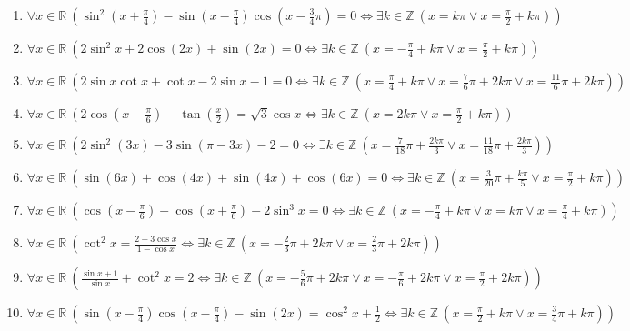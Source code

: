 \documentclass[11pt,a4paper]{article}
\begin{document}
\begin{enumerate}
\item $\displaystyle \forall x \in \mathbb{R}\ \left( \sin^{2}\left(x + \frac{\pi}{4}\right) - \sin\left(x - \frac{\pi}{4}\right)\cos\left(x - \frac{3}{4}\pi\right) = 0 \iff \exists k \in \mathbb{Z}\ \left( x = k\pi \lor x = \frac{\pi}{2} + k\pi \right) \right)$
\item $\displaystyle \forall x \in \mathbb{R}\ \left( 2\sin^{2} x + 2\cos\left(2x\right) + \sin\left(2x\right) = 0 \iff \exists k \in \mathbb{Z}\ \left( x = -\frac{\pi}{4} + k\pi \lor x = \frac{\pi}{2} + k\pi \right) \right)$
\item $\displaystyle \forall x \in \mathbb{R}\ \left( 2\sin x \cot x + \cot x - 2\sin x - 1 = 0 \iff \exists k \in \mathbb{Z}\ \left( x = \frac{\pi}{4} + k\pi \lor x = \frac{7}{6}\pi + 2k\pi \lor x = \frac{11}{6}\pi + 2k\pi \right) \right)$
\item $\displaystyle \forall x \in \mathbb{R}\ \left( 2\cos\left(x - \frac{\pi}{6}\right) - \tan\left(\frac{x}{2}\right) = \sqrt{3}\cos x \iff \exists k \in \mathbb{Z}\ \left( x = 2k\pi \lor x = \frac{\pi}{2} + k\pi \right) \right)$
\item $\displaystyle \forall x \in \mathbb{R}\ \left( 2\sin^{2}\left(3x\right) - 3\sin\left(\pi - 3x\right) - 2 = 0 \iff \exists k \in \mathbb{Z}\ \left( x = \frac{7}{18}\pi + \frac{2k\pi}{3} \lor x = \frac{11}{18}\pi + \frac{2k\pi}{3} \right) \right)$
\item $\displaystyle \forall x \in \mathbb{R}\ \left( \sin\left(6x\right) + \cos\left(4x\right) + \sin\left(4x\right) + \cos\left(6x\right) = 0 \iff \exists k \in \mathbb{Z}\ \left( x = \frac{3}{20}\pi + \frac{k\pi}{5} \lor x = \frac{\pi}{2} + k\pi \right) \right)$
\item $\displaystyle \forall x \in \mathbb{R}\ \left( \cos\left(x - \frac{\pi}{6}\right) - \cos\left(x + \frac{\pi}{6}\right) - 2\sin^{3} x = 0 \iff \exists k \in \mathbb{Z}\ \left( x = -\frac{\pi}{4} + k\pi \lor x = k\pi \lor x = \frac{\pi}{4} + k\pi \right) \right)$
\item $\displaystyle \forall x \in \mathbb{R}\ \left( \cot^{2} x = \frac{2 + 3\cos x}{1 - \cos x} \iff \exists k \in \mathbb{Z}\ \left( x = -\frac{2}{3}\pi + 2k\pi \lor x = \frac{2}{3}\pi + 2k\pi \right) \right)$
\item $\displaystyle \forall x \in \mathbb{R}\ \left( \frac{\sin x + 1}{\sin x} + \cot^{2} x = 2 \iff \exists k \in \mathbb{Z}\ \left( x = -\frac{5}{6}\pi + 2k\pi \lor x = -\frac{\pi}{6} + 2k\pi \lor x = \frac{\pi}{2} + 2k\pi \right) \right)$
\item $\displaystyle \forall x \in \mathbb{R}\ \left( \sin\left(x - \frac{\pi}{4}\right)\cos\left(x - \frac{\pi}{4}\right) - \sin\left(2x\right) = \cos^{2} x + \frac{1}{2} \iff \exists k \in \mathbb{Z}\ \left( x = \frac{\pi}{2} + k\pi \lor x = \frac{3}{4}\pi + k\pi \right) \right)$

\end{enumerate}
\end{document}

